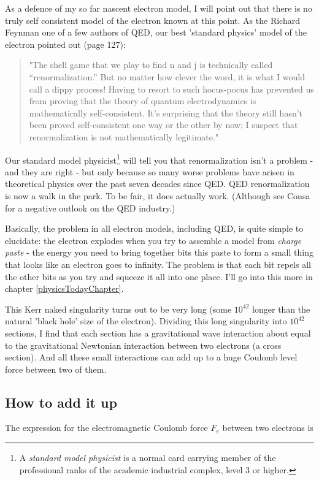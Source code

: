 \documentclass[../rzero]{subfiles}
\begin{document}
As a defence of my so far nascent electron model, I will point out that there is no truly self consistent model of the electron known at this point. As the Richard Feynman one of a few authors of QED, our best 'standard physics' model of the electron pointed out\cite{Feynman1985} (page 127): 

\begin{quotation}
"The shell game that we play to find n and j is technically called “renormalization.” But no matter how clever the word, it is what I would call a dippy process! Having to resort to such hocus-pocus has prevented us from proving that the theory of quantum electrodynamics is mathematically self-consistent. It’s surprising that the theory still hasn’t been proved self-consistent one way or the other by now; I suspect that renormalization is not mathematically legitimate." 
\end{quotation}

Our standard model physicist\footnote{A \textit{standard model physicist} is a normal card carrying member of the professional ranks of the academic industrial complex, level 3 or higher.} will tell you that renormalization isn't a problem - and they are right - but only because so many worse problems have arisen in theoretical physics over the past seven decades since QED\cite{feynmanSpaceTimeApproachQuantum1949}. QED renormalization is now a walk in the park. To be fair, it does actually work. (Although see Consa\cite{Cioletti2006} for a negative outlook on the QED industry.)

Basically, the problem in all electron models, including QED, is quite simple to elucidate: the electron explodes when you try to assemble a model from \textit{charge paste} - the energy you need to bring together bits this paste to form a small thing that looks like an electron goes to infinity. The problem is that each bit repels all the other bits as you try and squeeze it all into one place. I'll go into this more in chapter \ref{physicsTodayChapter}.  

This Kerr naked singularity turns out to be very long (some $10^{42}$ longer than the natural 'black hole' size of the electron). Dividing this long singularity into  $10^{42}$ sections, I find that each section has a gravitational wave interaction about equal to the gravitational Newtonian interaction between two electrons (a cross section). And all these small interactions can add up to a huge Coulomb level force between two of them.  

\subsection{How to add it up}
The expression for the electromagnetic Coulomb force $F_e$ between two electrons is 
\end{document}
